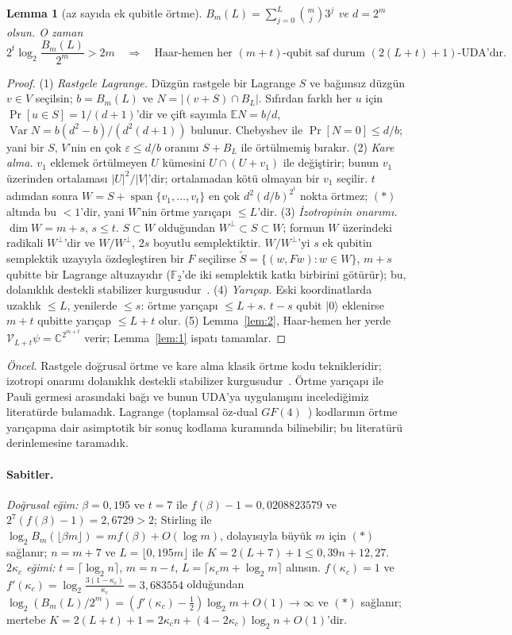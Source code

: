 \documentclass[aps,pra,onecolumn,superscriptaddress,nofootinbib,longbibliography,10pt]{revtex4-2}
\newtheorem{lemma}{Lemma}
\theoremstyle{definition}
\newcommand{\CC}{\mathbb C}
\newcommand{\FF}{\mathbb F}
\newcommand{\kc}{\kappa_c}
\begin{document}
\begin{lemma}[az sayıda ek qubitle örtme]\label{lem:3}
$B_m(L)=\sum_{j=0}^{L}\binom mj3^j$ ve $d=2^m$ olsun. O zaman
\[
2^t\log_2\frac{B_m(L)}{2^m}>2m\quad\Longrightarrow\quad\text{Haar-hemen her $(m+t)$-qubit saf durum $(2(L+t)+1)$-UDA'dır.}\tag{$*$}
\]
\end{lemma}
\begin{proof}
(1) \emph{Rastgele Lagrange.} Düzgün rastgele bir Lagrange $S$ ve bağımsız düzgün $v\in V$ seçilsin; $b=B_m(L)$ ve $N=|(v+S)\cap B_L|$. Sıfırdan farklı her $u$ için $\Pr[u\in S]=1/(d+1)$'dir ve çift sayımla $\mathbb EN=b/d$, $\operatorname{Var}N=b(d^2-b)/(d^2(d+1))$ bulunur. Chebyshev ile $\Pr[N=0]\le d/b$; yani bir $S$, $V$'nin en çok $\varepsilon\le d/b$ oranını $S+B_L$ ile örtülmemiş bırakır.
(2) \emph{Kare alma.} $v_1$ eklemek örtülmeyen $U$ kümesini $U\cap(U+v_1)$ ile değiştirir; bunun $v_1$ üzerinden ortalaması $|U|^2/|V|$'dir; ortalamadan kötü olmayan bir $v_1$ seçilir. $t$ adımdan sonra $W=S+\operatorname{span}\{v_1,\dots,v_t\}$ en çok $d^2(d/b)^{2^t}$ nokta örtmez; $(*)$ altında bu $<1$'dir, yani $W$'nin örtme yarıçapı $\le L$'dir.
(3) \emph{İzotropinin onarımı.} $\dim W=m+s$, $s\le t$. $S\subset W$ olduğundan $W^\perp\subset S\subset W$; formun $W$ üzerindeki radikali $W^\perp$'dir ve $W/W^\perp$, $2s$ boyutlu semplektiktir. $W/W^\perp$'yi $s$ ek qubitin semplektik uzayıyla özdeşleştiren bir $F$ seçilirse $\widetilde S=\{(w,Fw):w\in W\}$, $m+s$ qubitte bir Lagrange altuzayıdır ($\FF_2$'de iki semplektik katkı birbirini götürür); bu, dolanıklık destekli stabilizer kurgusudur~\cite{BDH06}.
(4) \emph{Yarıçap.} Eski koordinatlarda uzaklık $\le L$, yenilerde $\le s$: örtme yarıçapı $\le L+s$. $t-s$ qubit $|0\rangle$ eklenirse $m+t$ qubitte yarıçap $\le L+t$ olur.
(5) Lemma~\ref{lem:2}, Haar-hemen her yerde $\mathcal V_{L+t}\psi=\CC^{2^{m+t}}$ verir; Lemma~\ref{lem:1} ispatı tamamlar.
\end{proof}
\noindent \emph{Öncel.} Rastgele doğrusal örtme ve kare alma klasik örtme kodu teknikleridir; izotropi onarımı dolanıklık destekli stabilizer kurgusudur~\cite{BDH06}. Örtme yarıçapı ile Pauli germesi arasındaki bağı ve bunun UDA'ya uygulanışını incelediğimiz literatürde bulamadık. Lagrange (toplamsal öz-dual $GF(4)$~\cite{CRSS98}) kodlarının örtme yarıçapına dair asimptotik bir sonuç kodlama kuramında bilinebilir; bu literatürü derinlemesine taramadık.

\paragraph*{Sabitler.} \emph{Doğrusal eğim:} $\beta=0{,}195$ ve $t=7$ ile $f(\beta)-1=0{,}0208823579$ ve $2^7(f(\beta)-1)=2{,}6729>2$; Stirling ile $\log_2B_m(\lfloor\beta m\rfloor)=mf(\beta)+O(\log m)$, dolayısıyla büyük $m$ için $(*)$ sağlanır; $n=m+7$ ve $L=\lfloor0{,}195m\rfloor$ ile $K=2(L+7)+1\le0{,}39n+12{,}27$. \emph{$2\kc$ eğimi:} $t=\lceil\log_2n\rceil$, $m=n-t$, $L=\lceil\kc m+\log_2m\rceil$ alınsın. $f(\kc)=1$ ve $f'(\kc)=\log_2\frac{3(1-\kc)}{\kc}=3{,}683554$ olduğundan $\log_2(B_m(L)/2^m)=(f'(\kc)-\tfrac12)\log_2m+O(1)\to\infty$ ve $(*)$ sağlanır; mertebe $K=2(L+t)+1=2\kc n+(4-2\kc)\log_2n+O(1)$'dir.
\end{document}
